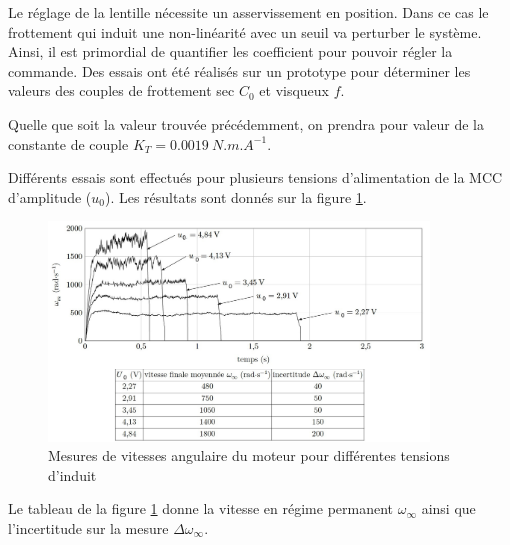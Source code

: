 Le réglage de la lentille nécessite un asservissement en position. Dans ce cas le frottement qui induit une non-linéarité avec un seuil va perturber le système. Ainsi, il est primordial de quantifier les coefficient pour pouvoir
régler la commande. Des essais ont été réalisés sur un prototype pour déterminer les valeurs des couples de
frottement sec $C_0$ et visqueux $f$.

Quelle que soit la valeur trouvée précédemment, on prendra pour valeur de la constante de couple $K_T= \SI{0,0019}{N. m. A^{-1}}$.

Différents essais sont effectués pour plusieurs tensions d'alimentation de la MCC d'amplitude ($u_0$). Les résultats sont donnés sur
la figure \ref{fig13}.

\begin{figure}[!htb]
\begin{center}
\includegraphics[width=0.9\textwidth]{images/image_fig13.jpg}
\caption{Mesures de vitesses angulaire du moteur pour différentes tensions d’induit \label{fig13}}
\end{center}
\end{figure}




Le tableau de la figure \ref{fig13} donne la vitesse en régime permanent $\omega_{\infty}$ ainsi que l'incertitude sur la mesure $\Delta \omega_{\infty}$.

\ifprof
\begin{corrige}
\end{corrige}
\else
\fi


\ifprof
\begin{corrige}
\end{corrige}
\else
\fi


